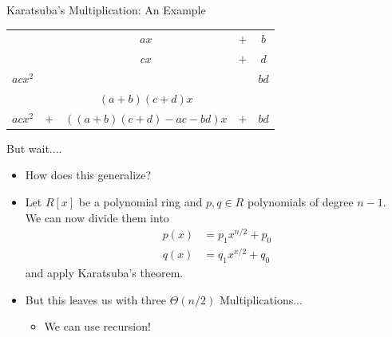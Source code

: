 \documentclass[12pt]{beamer}
\begin{document}
\begin{frame}{Karatsuba's Multiplication: An Example}
\begin{center}
{\normalsize
\begin{tabular}{ccccc}
        &   &      $ax$  & $+$ & $b$  \\
        &   &     $cx$   & $+$ & $d$  \\
\hline
$acx^2$ &   &            &     & $bd$ \\
        &   &    $(a+b)(c+d)x$   &     &      \\
\hline
$acx^2$ &$+$& $((a+b)(c+d)-ac-bd)x$ & $+$ & $bd$
\end{tabular}
}
\end{center}
\end{frame}

\begin{frame}{But wait....}
\begin{itemize}
\item How does this generalize?
\pause
\item Let $R[x]$ be a polynomial ring and $p,q\in R$ polynomials of degree $n-1$.\\
We can now divide them into
\begin{align*}
p(x) &= p_1 x^{n/2} + p_0\\
q(x) &= q_1 x^{x/2} + q_0
\end{align*}
and apply Karatsuba's theorem.
\pause
\item But this leaves us with three $\Theta(n/2)$ Multiplications...
\pause
\begin{itemize}
\item We can use recursion!
\end{itemize}
\end{itemize}
\end{frame}
\end{document}
